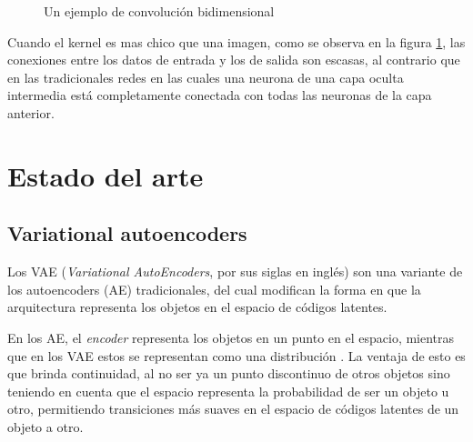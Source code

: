 \documentclass[spanish]{article}
\begin{document}
\begin{figure}[H]
\caption{Un ejemplo de convolución bidimensional \cite{goodfellow2016deep}}
\label{convolucion}
\end{figure}

Cuando el kernel es mas chico que una imagen, como se observa en la
figura \ref{convolucion}, las conexiones entre los datos de entrada
y los de salida son escasas, al contrario que en las tradicionales
redes en las cuales una neurona de una capa oculta intermedia está
completamente conectada con todas las neuronas de la capa anterior.

\clearpage


\section{Estado del arte}

\subsection{Variational autoencoders}
Los VAE (\textit{Variational AutoEncoders}, por sus siglas en inglés)
son una variante de los autoencoders (AE) tradicionales, del cual
modifican la forma en que la arquitectura representa los objetos en
el espacio de códigos latentes.  

En los AE, el \textit{encoder} representa los objetos en un punto en
el espacio, mientras que en los VAE estos se representan como una
distribución \cite{Foster2019}. La ventaja de esto es que brinda
continuidad, al no ser ya un punto discontinuo de otros objetos sino
teniendo en cuenta que el espacio representa la probabilidad de ser un
objeto u otro, permitiendo transiciones más suaves en el espacio de
códigos latentes de un objeto a otro.
\end{document}
